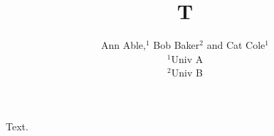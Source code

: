 \documentclass{mnras}
\title{T}\author[A. Able et al.]{Ann Able,$^{1}$ Bob Baker$^{2}$ \newauthor and Cat Cole$^{1}$\\ $^{1}$Univ A\\ $^{2}$Univ B}
\begin{document}
\maketitle
Text.
\end{document}
